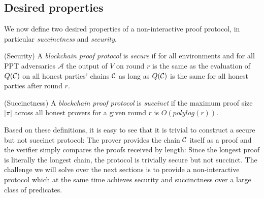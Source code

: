 \subsection{Desired properties}

We now define two desired properties of a non-interactive proof protocol, in
particular \textit{succinctness} and \textit{security}.

\begin{definition}{(Security)}
A \textit{blockchain proof protocol} is \textit{secure} if for all environments
and for all PPT adversaries $\mathcal{A}$ the output of $V$ on round $r$ is the
same as the evaluation of $Q(\mathcal{C})$ on all honest parties' chains $\mathcal{C}$ as
long as $Q(\mathcal{C})$ is the same for all honest parties after round $r$.
\end{definition}

\begin{definition}{(Succinctness)}
A \textit{blockchain proof protocol} is \textit{succinct} if the maximum proof
size $|\pi|$ across all honest provers for a given round $r$ is
$O(polylog(r))$.
\end{definition}

Based on these definitions, it is easy to see that it is trivial to construct a
secure but not succinct protocol: The prover provides the chain $\mathcal{C}$ itself
as a proof and the verifier simply compares the proofs received by length:
Since the longest proof is literally the longest chain, the protocol is
trivially secure but not succinct. The challenge we will solve over the next
sections is to provide a non-interactive protocol which at the same time
achieves security and succinctness over a large class of predicates.


